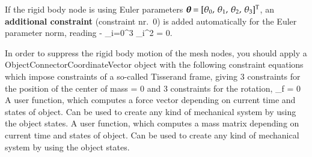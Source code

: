     \noindent If the rigid body node is using Euler parameters $\mbox{\boldmath $\theta$ \unboldmath}\!\! = [\theta_0,\,\theta_1,\,\theta_2,\,\theta_3]^\mathrm{T}$, an {\bf additional constraint} (constraint nr.\ 0) is 
    added automatically for the Euler parameter norm, reading
     - \sum_{i=0}^{3} \theta_i^2 = 0.
    \ee
    
    In order to suppress the rigid body motion of the mesh nodes, you should apply a ObjectConnectorCoordinateVector object with the following constraint
    equations which impose constraints of a so-called Tisserand frame, giving 3 constraints for the position of the center of mass
    \be
    		\Phi\indt\tp {} \qv\indf = 0
    \ee
    and 3 constraints for the rotation,
    \be
    		\tilde\xv_{f}\tp {} \qv\indf = 0
    \ee
    A user function, which computes a force vector depending on current time and states of object. Can be used to create any kind of mechanical system by using the object states.
    \finishTable
    A user function, which computes a mass matrix depending on current time and states of object. Can be used to create any kind of mechanical system by using the object states.
